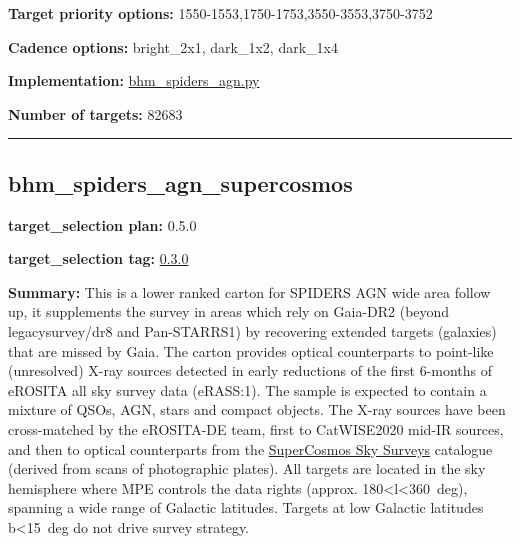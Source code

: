\noindent\textbf{Target priority options:}
1550-1553,1750-1753,3550-3553,3750-3752

\noindent\textbf{Cadence options:} bright\_2x1, dark\_1x2, dark\_1x4

\noindent\textbf{Implementation:}
\href{https://github.com/sdss/target_selection/blob/0.3.0/python/target_selection/cartons/bhm_spiders_agn.py}{bhm\_spiders\_agn.py}

\noindent\textbf{Number of targets:} 82683

\begin{center}\rule{0.5\linewidth}{0.5pt}\end{center}

\hypertarget{bhm_spiders_agn_supercosmos_plan0.5.0}{%
\subsection{bhm\_spiders\_agn\_supercosmos}\label{bhm_spiders_agn_supercosmos_plan0.5.0}}

\noindent\textbf{target\_selection plan:} 0.5.0

\noindent\textbf{target\_selection tag:}
\href{https://github.com/sdss/target_selection/tree/0.3.0/}{0.3.0}

\noindent\textbf{Summary:} This is a lower ranked carton for SPIDERS AGN wide
area follow up, it supplements the survey in areas which rely on
Gaia-DR2 (beyond legacysurvey/dr8 and Pan-STARRS1) by recovering
extended targets (galaxies) that are missed by Gaia. The carton provides
optical counterparts to point-like (unresolved) X-ray sources detected
in early reductions of the first 6-months of eROSITA all sky survey data
(eRASS:1). The sample is expected to contain a mixture of QSOs, AGN,
stars and compact objects. The X-ray sources have been cross-matched by
the eROSITA-DE team, first to
CatWISE2020 \citep{Marocco2021}
mid-IR sources, and then to optical counterparts from the
\href{http://www-wfau.roe.ac.uk/sss/intro.html}{SuperCosmos Sky Surveys}
catalogue (derived from scans of photographic plates). All targets are
located in the sky hemisphere where MPE controls the data rights
(approx. 180\textless{}l\textless{}360~deg), spanning a wide range of
Galactic latitudes. Targets at low Galactic latitudes
\textbar{}b\textbar{}\textless{}15~deg do not drive survey strategy.

